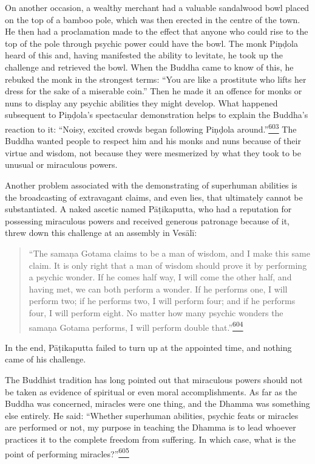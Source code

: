 On another occasion, a wealthy merchant had a valuable sandalwood bowl
placed on the top of a bamboo pole, which was then erected in the centre
of the town. He then had a proclamation made to the effect that anyone
who could rise to the top of the pole through psychic power could have
the bowl. The monk Piṇḍola heard of this and, having manifested the
ability to levitate, he took up the challenge and retrieved the bowl.
When the Buddha came to know of this, he rebuked the monk in the
strongest terms: ``You are like a prostitute who lifts her dress for the
sake of a miserable coin.'' Then he made it an offence for monks or nuns
to display any psychic abilities they might develop. What happened
subsequent to Piṇḍola's spectacular demonstration helps to explain the
Buddha's reaction to it: ``Noisy, excited crowds began following Piṇḍola
around.''\label{footprints_split_015.html_fnref603}\hyperref[footprints_split_025.htmlux5cux23fn603]{\textsuperscript{603}}
The Buddha wanted people to respect him and his monks and nuns because
of their virtue and wisdom, not because they were mesmerized by what
they took to be unusual or miraculous powers.

Another problem associated with the demonstrating of superhuman
abilities is the broadcasting of extravagant claims, and even lies, that
ultimately cannot be substantiated. A naked ascetic named Pāṭikaputta,
who had a reputation for possessing miraculous powers and received
generous patronage because of it, threw down this challenge at an
assembly in Vesālī:

\begin{quote}
``The samaṇa Gotama claims to be a man of wisdom, and I make this same
claim. It is only right that a man of wisdom should prove it by
performing a psychic wonder. If he comes half way, I will come the other
half, and having met, we can both perform a wonder. If he performs one,
I will perform two; if he performs two, I will perform four; and if he
performs four, I will perform eight. No matter how many psychic wonders
the samaṇa Gotama performs, I will perform double
that.''\label{footprints_split_015.html_fnref604}\hyperref[footprints_split_025.htmlux5cux23fn604]{\textsuperscript{604}}
\end{quote}

In the end, Pāṭikaputta failed to turn up at the appointed time, and
nothing came of his challenge.

The Buddhist tradition has long pointed out that miraculous powers
should not be taken as evidence of spiritual or even moral
accomplishments. As far as the Buddha was concerned, miracles were one
thing, and the Dhamma was something else entirely. He said: ``Whether
superhuman abilities, psychic feats or miracles are performed or not, my
purpose in teaching the Dhamma is to lead whoever practices it to the
complete freedom from suffering. In which case, what is the point of
performing
miracles?''\label{footprints_split_015.html_fnref605}\hyperref[footprints_split_025.htmlux5cux23fn605]{\textsuperscript{605}}

